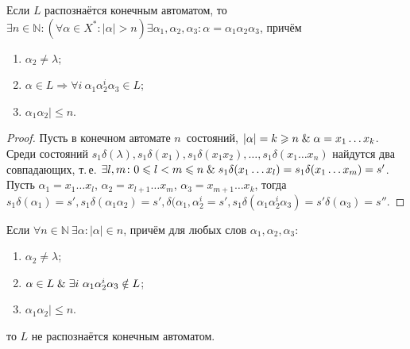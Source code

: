 \begin{lemma}[о накачке]
Если $L$ распознаётся конечным автоматом, то $\exists n \in \mathbb N \colon (\forall \alpha \in X^* \colon |\alpha| > n) \exists \alpha_1, \alpha_2, \alpha_3 \colon \alpha = \alpha_1 \alpha_2 \alpha_3$, причём
\begin{enumerate}	
	\item $\alpha_2 \neq \lambda$;
	\item $\alpha \in L \Rightarrow \forall i \ \alpha_1 \alpha_2^i \alpha_3 \in L$;
	\item $\alpha_1 \alpha_2| \leqslant n$.
\end{enumerate}
\end{lemma}
\begin{proof}
Пусть в конечном автомате $n$~состояний, $|\alpha| = k \geqslant n \mathrel{\&} \alpha = x_1 \ldots x_k$.
Среди состояний $s_1 \delta(\lambda), s_1 \delta(x_1), s_1 \delta(x_1 x_2), \ldots, s_1 \delta(x_1 \ldots x_n)$ найдутся два совпадающих, т.\,е.
$\exists l, m \colon 0 \leqslant l < m \leqslant n \mathrel{\&} s_1 \delta(x_1 \ldots x_l) = s_1 \delta(x_1 \ldots x_m) = s'$.
Пусть $\alpha_1 = x_1 \ldots x_l$, $\alpha_2 = x_{l+1} \ldots x_m$, $\alpha_3 = x_{m+1} \ldots x_k$, тогда $s_1 \delta(\alpha_1) = s', s_1 \delta(\alpha_1 \alpha_2) = s', \delta(\alpha_1, \alpha_2^i = s', s_1 \delta(\alpha_1 \alpha_2^i \alpha_3) = s' \delta(\alpha_3) = s''$.
\end{proof}

\begin{consequent}
Если $\forall n \in \mathbb N \ \exists \alpha \colon |\alpha| \in n$, причём для любых слов $\alpha_1, \alpha_2, \alpha_3$:
\begin{enumerate}
	\item $\alpha_2 \neq \lambda$;
	\item $\alpha \in L \lAnd \exists i \ \alpha_1 \alpha_2^i \alpha_3 \notin L$;
	\item $\alpha_1 \alpha_2| \leqslant n$.
\end{enumerate}
то $L$ не распознаётся конечным автоматом.
\end{consequent}